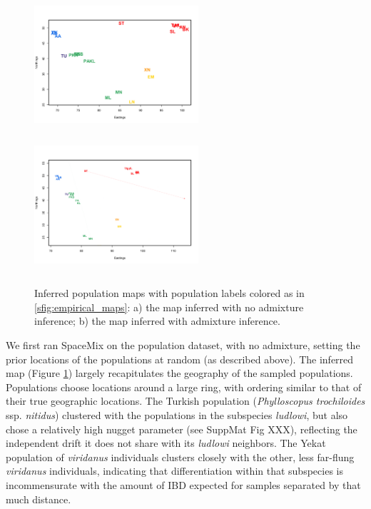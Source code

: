 \documentclass[12pt]{article}
\begin{document}
\begin{figure}
	\centering
			{\includegraphics[width=2.4in,height=2in]{figs/warblers/warb_pop_noad.png}}
			{\includegraphics[width=2.4in,height=2in]{figs/warblers/population_warbler_map_randpr1.png}}
\caption{Inferred population maps with population labels colored as in \ref{sfig:empirical_maps}: a) the map inferred with no admixture inference; b) the map inferred with admixture inference.}
\label{sfig:warbler_pop}
\end{figure}

We first ran SpaceMix on the population dataset, with no admixture, setting the prior locations of the populations at random (as described above). The inferred map (Figure \ref{sfig:warbler_pop}) largely recapitulates the geography of the sampled populations.  Populations choose locations around a large ring, with ordering similar to that of their true geographic locations.  The Turkish population (\textit{Phylloscopus trochiloides} ssp. \textit{nitidus}) clustered with the populations in the subspecies \textit{ludlowi}, but also chose a relatively high nugget parameter (see SuppMat Fig XXX), reflecting the independent drift it does not share with its \textit{ludlowi} neighbors.  The Yekat population of \textit{viridanus} individuals clusters closely with the other, less far-flung \textit{viridanus} individuals, indicating that differentiation within that subspecies is incommensurate with the amount of IBD expected for samples separated by that much distance. 
\end{document}
